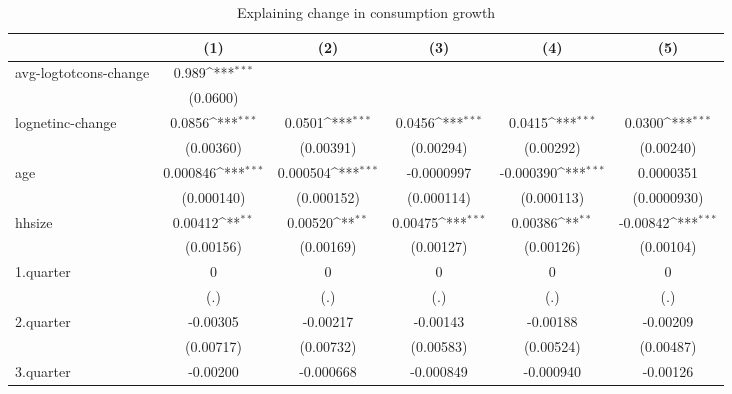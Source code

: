 \begin{table}[htbp]\centering
\def\sym#1{\ifmmode^{#1}\else\(^{#1}\)\fi}
\caption{\label{tab:log2.2B-deltacons-net} Explaining change in consumption growth}
\begin{tabular}{l*{5}{c}}
\hline\hline
            &\multicolumn{1}{c}{(1)}         &\multicolumn{1}{c}{(2)}         &\multicolumn{1}{c}{(3)}         &\multicolumn{1}{c}{(4)}         &\multicolumn{1}{c}{(5)}         \\
\hline
avg-logtotcons-change&       0.989\sym{***}&                     &                     &                     &                     \\
            &    (0.0600)         &                     &                     &                     &                     \\
lognetinc-change&      0.0856\sym{***}&      0.0501\sym{***}&      0.0456\sym{***}&      0.0415\sym{***}&      0.0300\sym{***}\\
            &   (0.00360)         &   (0.00391)         &   (0.00294)         &   (0.00292)         &   (0.00240)         \\
age         &    0.000846\sym{***}&    0.000504\sym{***}&  -0.0000997         &   -0.000390\sym{***}&   0.0000351         \\
            &  (0.000140)         &  (0.000152)         &  (0.000114)         &  (0.000113)         & (0.0000930)         \\
hhsize      &     0.00412\sym{**} &     0.00520\sym{**} &     0.00475\sym{***}&     0.00386\sym{**} &    -0.00842\sym{***}\\
            &   (0.00156)         &   (0.00169)         &   (0.00127)         &   (0.00126)         &   (0.00104)         \\
1.quarter   &           0         &           0         &           0         &           0         &           0         \\
            &         (.)         &         (.)         &         (.)         &         (.)         &         (.)         \\
2.quarter   &    -0.00305         &    -0.00217         &    -0.00143         &    -0.00188         &    -0.00209         \\
            &   (0.00717)         &   (0.00732)         &   (0.00583)         &   (0.00524)         &   (0.00487)         \\
3.quarter   &    -0.00200         &   -0.000668         &   -0.000849         &   -0.000940         &    -0.00126         \\

\end{tabular}
\end{table}
